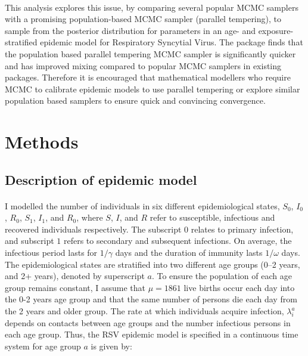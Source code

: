 \documentclass[10pt,twoside]{report} %
\begin{document}
\paragraph{}This analysis explores this issue, by comparing several popular MCMC samplers with a promising population-based MCMC sampler (parallel tempering), to sample from the posterior distribution for parameters in an age- and exposure-stratified epidemic model for Respiratory Syncytial Virus. The package finds that the population based parallel tempering MCMC sampler is significantly quicker and has improved mixing compared to popular MCMC samplers in existing packages. Therefore it is encouraged that mathematical modellers who require MCMC to calibrate epidemic models to use parallel tempering or explore similar population based samplers to ensure quick and convincing convergence. 

\section{Methods}
\subsection{Description of epidemic model}
\paragraph{}I modelled the number of individuals in six different epidemiological states, $S_0$, $I_0$, $R_0$, $S_1$, $I_1$, and $R_0$, where $S$, $I$, and $R$ refer to susceptible, infectious and recovered individuals respectively. The subscript $0$ relates to primary infection, and subscript $1$ refers to secondary and subsequent infections. On average, the infectious period lasts for $1/\gamma$ days and the duration of immunity lasts $1/\omega$ days. The epidemiological states are stratified into two different age groups (0--2 years, and 2+ years), denoted by superscript $a$. To ensure the population of each age group remains constant, I assume that $\mu = 1861$ live births occur each day into the 0-2 years age group and that the same number of persons die each day from the 2 years and older group. The rate at which individuals acquire infection, $\lambda^a_i$ depends on contacts between age groups and the number infectious persons in each age group. Thus, the RSV epidemic model is specified in a continuous time system for age group $a$ is given by:
\end{document}
